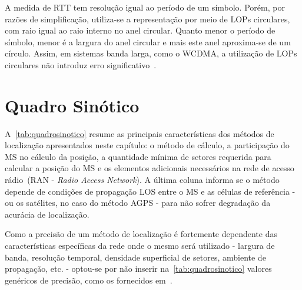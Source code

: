 A medida de RTT tem resolução igual ao período de um símbolo. Porém, por razões de simplificação, utiliza-se a representação por meio de LOPs circulares, com raio igual ao raio interno no anel circular. Quanto menor o período de símbolo, menor é a largura do anel circular e mais este anel aproxima-se de um círculo. Assim, em sistemas banda larga, como o WCDMA, a utilização de LOPs circulares não introduz erro significativo~\cite{CidRttForcedHandover}.

\section{\textbf{Quadro Sinótico}}
\label{sec:Cap1Quadro}

A~\ref{tab:quadrosinotico} resume as principais características dos métodos de localização apresentados neste capítulo: o método de cálculo, a participação do MS no cálculo da posição, a quantidade mínima de setores requerida para calcular a posição do MS e os elementos adicionais necessários na rede de acesso rádio~(RAN - \textit{Radio Access Network}). A última coluna informa se o método depende de condições de propagação LOS entre o MS e as células de referência - ou os satélites, no caso do método AGPS - para não sofrer degradação da acurácia de localização.

Como a precisão de um método de localização é fortemente dependente das características específicas da rede onde o mesmo será utilizado - largura de banda, resolução temporal, densidade superficial de setores, ambiente de propagação, etc. - optou-se por não inserir na~\ref{tab:quadrosinotico} valores genéricos de precisão, como os fornecidos em~\cite{WlanLocationMethodsSurvey}.

